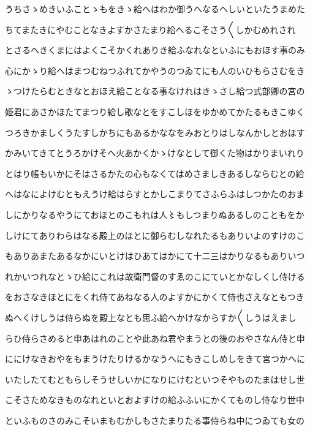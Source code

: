 \documentclass[a4paper,11pt,landscape]{ltjtarticle}
\begin{document}
うちさゝめきいふことゝもをきゝ給へはわか御うへなるへしいといたうまめた
\par\medskip
ちてまたきにやむことなきよすかさたまり給へるこそさう〱しかむめれされ
\par\medskip
とさるへきくまにはよくこそかくれありき給ふなれなといふにもおほす事のみ
\par\medskip
心にかゝり給へはまつむねつふれてかやうのつゐてにも人のいひもらさむをき
\par\medskip
ゝつけたらむときなとおほえ給ことなる事なけれはきゝさし給つ式部卿の宮の
\par\medskip
姫君にあさかほたてまつり給し歌なとをすこしほをゆかめてかたるもきこゆく
\par\medskip
つろきかましくうたすしかちにもあるかななをみおとりはしなんかしとおほす
\par\medskip
かみいてきてとうろかけそへ火あかくかゝけなとして御くた物はかりまいれり
\par\medskip
とはり帳もいかにそはさるかたの心もなくてはめさましきあるしならむとの給
\par\medskip
へはなによけむともえうけ給はらすとかしこまりてさふらふはしつかたのおま
\par\medskip
しにかりなるやうにておほとのこもれは人〻もしつまりぬあるしのこともをか
\par\medskip
しけにてありわらはなる殿上のほとに御らむしなれたるもありいよのすけのこ
\par\medskip
もありあまたあるなかにいとけはひあてはかにて十二三はかりなるもありいつ
\par\medskip
れかいつれなとゝひ給にこれは故衛門督のすゑのこにていとかなしくし侍ける
\par\medskip
をおさなきほとにをくれ侍てあねなる人のよすかにかくて侍也さえなともつき
\par\medskip
ぬへくけしうは侍らぬを殿上なとも思ふ給へかけなからすか〱しうはえまし
\par\medskip
らひ侍らさめると申あはれのことや此あね君やまうとの後のおやさなん侍と申
\par\medskip
ににけなきおやをもまうけたりけるかなうへにもきこしめしをきて宮つかへに
\par\medskip
いたしたてむともらしそうせしいかになりにけむといつそやものたまはせし世
\par\medskip
こそさためなきものなれといとおよすけの給ふふいにかくてものし侍なり世中
\par\medskip
といふものさのみこそいまもむかしもさたまりたる事侍らね中につゐても女の
\par\medskip
\end{document}
